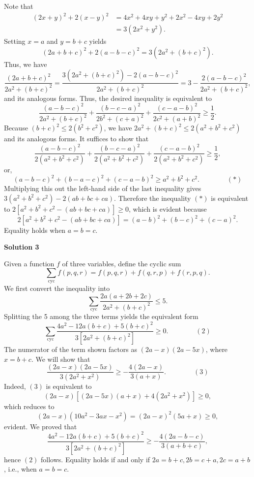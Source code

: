 \begin{enumerate}
Note that
 \begin{align*} (2x + y)^2 + 2(x - y)^2 &= 4x^2 + 4xy + y^2 + 2x^2 - 4xy + 2y^2 \\ &= 3(2x^2 + y^2). \end{align*}
Setting $x = a$ and $y = b + c$ yields
 \[(2a + b + c)^2 + 2(a - b - c)^2 = 3(2a^2 + (b + c)^2).\]Thus, we have
 \[\frac{(2a + b + c)^2}{2a^2 + (b + c)^2} = \frac{3(2a^2 + (b + c)^2) - 2(a - b - c)^2}{2a^2 + (b + c)^2} = 3 - \frac{2(a - b - c)^2}{2a^2 + (b + c)^2},\]and its analogous forms. Thus, the desired inequality is equivalent to
 \[\frac{(a - b - c)^2}{2a^2 + (b + c)^2} + \frac{(b - c - a)^2}{2b^2 + (c + a)^2} + \frac{(c - a - b)^2}{2c^2 + (a + b)^2}\geq\frac{1}{2}.\]Because $(b + c)^2\leq 2(b^2 + c^2)$, we have $2a^2 + (b + c)^2\leq 2(a^2 + b^2 + c^2)$ and its analogous forms. It suffices to show that
 \[\frac{(a - b - c)^2}{2(a^2 + b^2 + c^2)} + \frac{(b - c - a)^2}{2(a^2 + b^2 + c^2)} + \frac{(c - a - b)^2}{2(a^2 + b^2 + c^2)}\geq\frac{1}{2},\]or,
 \[(a - b - c)^2 + (b - a - c)^2 + (c - a - b)^2\geq a^2 + b^2 + c^2.\qquad\qquad (*)\]Multiplying this out the left-hand side of the last inequality gives $3(a^2 + b^2 + c^2) - 2(ab + bc + ca)$. Therefore the inequality $(*)$ is equivalent to $2[a^2 + b^2 + c^2 - (ab + bc + ca)]\geq 0$, which is evident because
 \[2[a^2 + b^2 + c^2 - (ab + bc + ca)] = (a - b)^2 + (b - c)^2 + (c - a)^2.\]Equality holds when $a = b = c$.

 



\textbf{Solution 3}

Given a function $f$ of three variables, define the cyclic sum
 \[\sum_{\text{cyc}}f(p,q,r) = f(p,q,r) + f(q,r,p) + f(r,p,q).\]We first convert the inequality into
 \[\sum_{\text{cyc}}\frac{2a(a + 2b + 2c)}{2a^2 + (b + c)^2}\leq 5.\]Splitting the 5 among the three terms yields the equivalent form
 \[\sum_{\text{cyc}}\frac{4a^2 - 12a(b + c) + 5(b + c)^2}{3[2a^2 + (b + c)^2]}\geq 0.\qquad\qquad (2)\]The numerator of the term shown factors as $(2a - x)(2a - 5x)$, where $x = b + c$. We will show that
 \[\frac{(2a - x)(2a - 5x)}{3(2a^2 + x^2)}\geq -\frac{4(2a - x)}{3(a + x)}.\qquad\qquad (3)\]Indeed, $(3)$ is equivalent to
 \[(2a - x)[(2a - 5x)(a + x) + 4(2a^2 + x^2)]\geq 0,\]which reduces to
 \[(2a - x)(10a^2 - 3ax - x^2) = (2a - x)^2(5a + x)\geq 0,\]evident. We proved that
 \[\frac{4a^2 - 12a(b + c) + 5(b + c)^2}{3[2a^2 + (b + c)^2]}\geq -\frac{4(2a - b - c)}{3(a + b + c)},\]hence $(2)$ follows. Equality holds if and only if $2a = b + c, 2b = c + a, 2c = a + b$, i.e., when $a = b = c$.


\end{enumerate}
